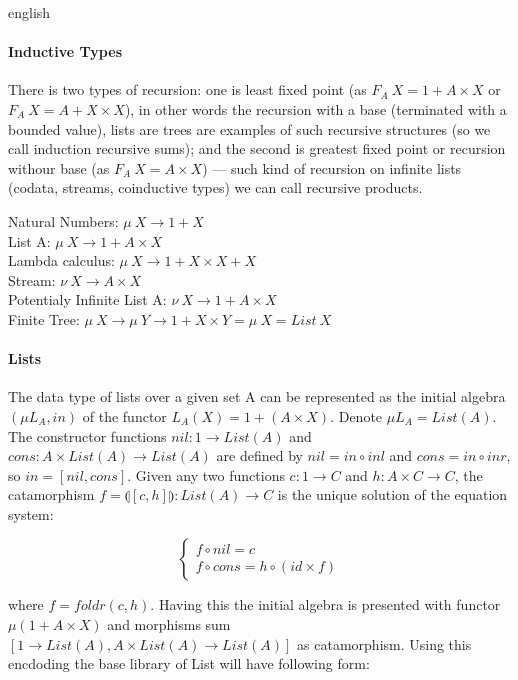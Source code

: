 \documentclass{abstract}
\begin{document}
\begin{theses}{english}
  \paragraph{Inductive Types}
  There is two types of recursion: one is least fixed point (as $F_A\ X = 1 + A\times X$ or $F_A\ X = A + X\times X$),
  in other words the recursion with a base (terminated with a bounded value), lists are trees are
  examples of such recursive structures (so we call induction recursive sums); and the second
  is greatest fixed point or recursion withour base (as $F_A\ X = A\times X $) --- such kind of
  recursion on infinite lists (codata, streams, coinductive types) we can call recursive products.

\begin{center}
  Natural Numbers: $\mu\ X \rightarrow 1 + X$ \\
  List A: $\mu\ X \rightarrow 1 + A \times X$ \\
  Lambda calculus: $\mu\ X \rightarrow 1 + X \times X + X$ \\
  Stream: $\nu\ X \rightarrow A \times X$ \\
  Potentialy Infinite List A: $\nu\ X \rightarrow 1 + A \times X$ \\
  Finite Tree: $\mu\ X \rightarrow \mu\ Y \rightarrow 1 + X \times Y = \mu\ X = List\ X$ \\
\end{center}

  \paragraph{Lists}
  The data type of lists over a given set A can be represented as the initial algebra
  $(\mu L_A, in)$ of the functor $L_A(X) = 1 + (A \times X)$. Denote $\mu L_A = List(A)$.
  The constructor functions $nil: 1 \rightarrow List(A)$ and
  $cons: A \times List(A) \rightarrow List(A)$ are defined by
  $nil = in \circ inl$ and $cons = in \circ inr$, so $in = [nil,cons]$.
  Given any two functions $c: 1 \rightarrow C$ and $h: A \times C \rightarrow C$,
  the catamorphism $f = \llparenthesis [c,h] \rrparenthesis : List(A) \rightarrow C$
  is the unique solution of the equation system:

$$
\begin{cases}
  f \circ nil  = c \\
  f \circ cons = h \circ (id \times f)
\end{cases}
$$

  where $f = foldr(c,h)$. Having this the initial algebra is presented with functor
  $\mu (1 + A \times X)$ and morphisms sum $[1 \rightarrow List(A), A \times List(A) \rightarrow List(A)]$
  as catamorphism. Using this encdoding the base library of List will have following form:


\end{theses}
\end{document}
